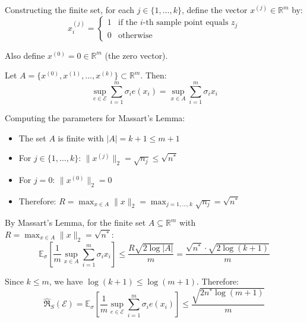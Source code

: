 \documentclass[letterpaper, 11pt]{article}
\newcommand{\1}{\mathds{1}}	%
\theoremstyle{definition}
\begin{document}
Constructing the finite set, for each $j \in \{1,\ldots,k\}$, define the vector $x^{(j)} \in \mathbb{R}^m$ by:
\[
x^{(j)}_i = \begin{cases} 
1 & \text{if the } i\text{-th sample point equals } z_j \\
0 & \text{otherwise}
\end{cases}
\]

Also define $x^{(0)} = 0 \in \mathbb{R}^m$ (the zero vector).

Let $A = \{x^{(0)}, x^{(1)}, \ldots, x^{(k)}\} \subset \mathbb{R}^m$. Then:
\[
\sup_{e \in \mathcal{E}} \sum_{i=1}^m \sigma_i e(x_i) = \sup_{x \in A} \sum_{i=1}^m \sigma_i x_i
\]

Computing the parameters for Massart's Lemma:

\begin{itemize}
\item The set $A$ is finite with $|A| = k + 1 \leq m + 1$
\item For $j \in \{1,\ldots,k\}$: $\|x^{(j)}\|_2 = \sqrt{n_j} \leq \sqrt{n^*}$
\item For $j = 0$: $\|x^{(0)}\|_2 = 0$
\item Therefore: $R = \max_{x \in A} \|x\|_2 = \max_{j=1,\ldots,k} \sqrt{n_j} = \sqrt{n^*}$
\end{itemize}

By Massart's Lemma, for the finite set $A \subseteq \mathbb{R}^m$ with $R = \max_{x \in A} \|x\|_2 = \sqrt{n^*}$:
\[
\mathbb{E}_{\sigma}\left[\frac{1}{m} \sup_{x \in A} \sum_{i=1}^m \sigma_i x_i\right] \leq \frac{R\sqrt{2\log|A|}}{m} = \frac{\sqrt{n^*} \cdot \sqrt{2\log(k+1)}}{m}
\]

Since $k \leq m$, we have $\log(k+1) \leq \log(m+1)$. Therefore:
\[
\widehat{\mathfrak{R}}_S(\mathcal{E}) = \mathbb{E}_{\sigma}\left[\frac{1}{m} \sup_{e \in \mathcal{E}} \sum_{i=1}^m \sigma_i e(x_i)\right] \leq \frac{\sqrt{2n^* \log(m+1)}}{m}
\]
\end{document}
